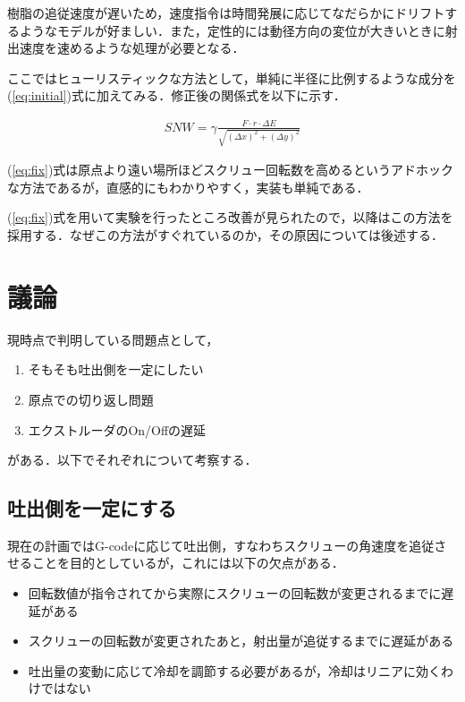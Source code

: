 \documentclass[twocolumn,oneside,a4paper]{article}
\begin{document}
樹脂の追従速度が遅いため，速度指令は時間発展に応じてなだらかにドリフトするようなモデルが好ましい．また，定性的には動径方向の変位が大きいときに射出速度を速めるような処理が必要となる．

ここではヒューリスティックな方法として，単純に半径に比例するような成分を(\ref{eq:initial})式に加えてみる．修正後の関係式を以下に示す．

\begin{eqnarray}\label{eq:fix}
  SNW = \gamma \frac{F\cdot r\cdot  \Delta E}{\sqrt{(\Delta x)^2+(\Delta y)^2}}
\end{eqnarray}

(\ref{eq:fix})式は原点より遠い場所ほどスクリュー回転数を高めるというアドホックな方法であるが，直感的にもわかりやすく，実装も単純である．

(\ref{eq:fix})式を用いて実験を行ったところ改善が見られたので，以降はこの方法を採用する．なぜこの方法がすぐれているのか，その原因については後述する．

\section{議論}
現時点で判明している問題点として，

\begin{enumerate}
     \item そもそも吐出側を一定にしたい
     \item 原点での切り返し問題
     \item エクストルーダのOn/Offの遅延
\end{enumerate}

がある．以下でそれぞれについて考察する．

\subsection{吐出側を一定にする}
現在の計画ではG-codeに応じて吐出側，すなわちスクリューの角速度を追従させることを目的としているが，これには以下の欠点がある．

\begin{itemize}
    \item 回転数値が指令されてから実際にスクリューの回転数が変更されるまでに遅延がある
    \item スクリューの回転数が変更されたあと，射出量が追従するまでに遅延がある
     \item 吐出量の変動に応じて冷却を調節する必要があるが，冷却はリニアに効くわけではない
\end{itemize}
\end{document}
